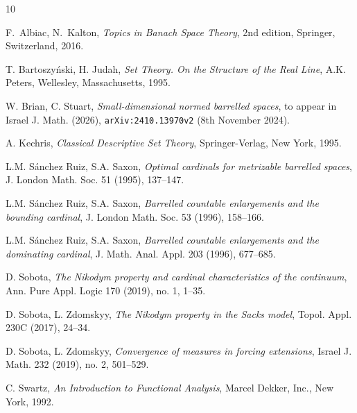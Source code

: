 \documentclass[a4paper,11pt,fleqn]{amsart}
\theoremstyle{definition}
\theoremstyle{remark}
\numberwithin{equation}{section}
\begin{document}
\begin{thebibliography}{10}

 F.\ Albiac, N.\ Kalton, {\em Topics in Banach Space Theory}, 2nd edition, Springer, Switzerland, 2016.

 T. Bartoszy\'nski, H. Judah, {\em Set Theory. On the Structure of the Real Line}, A.K. Peters, Wellesley, Massachusetts, 1995.

 W. Brian, C. Stuart, {\em Small-dimensional normed barrelled spaces}, to appear in Israel J. Math. (2026), \texttt{arXiv:2410.13970v2} (8th November 2024).

 A. Kechris, {\em Classical Descriptive Set Theory}, Springer-Verlag, New York, 1995.

 L.M. S\'anchez Ruiz, S.A. Saxon, {\em Optimal cardinals for metrizable barrelled spaces}, J. London Math. Soc. 51 (1995), 137--147.

 L.M. S\'anchez Ruiz, S.A. Saxon, {\em Barrelled countable enlargements and the bounding cardinal}, J. London Math. Soc. 53 (1996), 158--166.

 L.M. S\'anchez Ruiz, S.A. Saxon, {\em Barrelled countable enlargements and the dominating cardinal}, J. Math. Anal. Appl. 203 (1996), 677--685.

 D. Sobota, {\em The Nikodym property and cardinal characteristics of the continuum}, Ann. Pure Appl. Logic 170 (2019), no. 1, 1--35.

 D. Sobota, L. Zdomskyy, {\em The Nikodym property in the Sacks model}, Topol. Appl. 230C (2017), 24--34.

 D. Sobota, L. Zdomskyy, {\em Convergence of measures in forcing extensions}, Israel J. Math. 232 (2019), no. 2, 501--529.

 C. Swartz, {\em An Introduction to Functional Analysis}, Marcel Dekker, Inc., New York, 1992.

\end{thebibliography}
\end{document}
